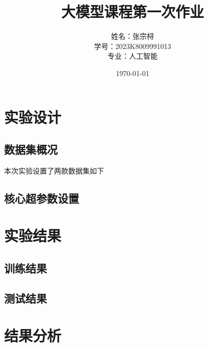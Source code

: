 \documentclass[a4paper,12pt]{ctexart} %
\title{\textbf{大模型课程第一次作业}}
\author{姓名：张宗桪 \\ 学号：2023K8009991013 \\ 专业：人工智能}
\date{\today}
\begin{document}
\pagestyle{plain} %

\maketitle
\thispagestyle{empty} %
\newpage

\tableofcontents
\newpage
\section{实验设计}


\subsection{数据集概况}
本次实验设置了两款数据集如下

\subsection{核心超参数设置}


\section{实验结果}


\subsection{训练结果}


\subsection{测试结果}


\section{结果分析}
\end{document}

